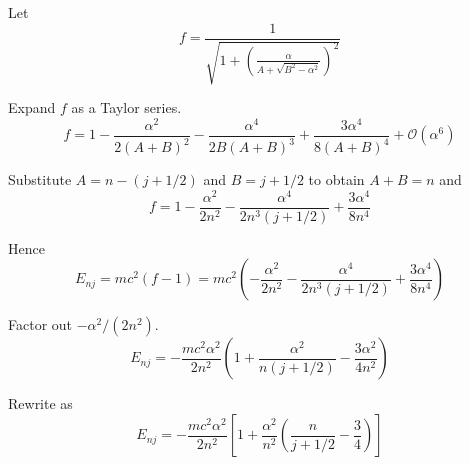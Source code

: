 


Let
\begin{equation*}
f=\frac{1}{\sqrt{\displaystyle1+\left(\frac{\alpha}{A+\sqrt{B^2-\alpha^2}}\right)^2}}
\end{equation*}

Expand $f$ as a Taylor series.
\begin{equation*}
f=1-\frac{\alpha^2}{2(A+B)^2}-\frac{\alpha^4}{2B(A+B)^3}+\frac{3\alpha^4}{8(A+B)^4}+\mathcal O(\alpha^6)
\end{equation*}

Substitute $A=n-(j+1/2)$ and $B=j+1/2$ to obtain $A+B=n$ and
\begin{equation*}
f=1-\frac{\alpha^2}{2n^2}-\frac{\alpha^4}{2n^3(j+1/2)}+\frac{3\alpha^4}{8n^4}
\tag{1}
\end{equation*}

Hence
\begin{equation*}
E_{nj}=mc^2(f-1)=mc^2\left(-\frac{\alpha^2}{2n^2}-\frac{\alpha^4}{2n^3(j+1/2)}+\frac{3\alpha^4}{8n^4}\right)
\end{equation*}

Factor out $-\alpha^2/(2n^2)$.
\begin{equation*}
E_{nj}=-\frac{mc^2\alpha^2}{2n^2}
\left(1+\frac{\alpha^2}{n(j+1/2)}-\frac{3\alpha^2}{4n^2}\right)
\tag{2}
\end{equation*}

Rewrite as
\begin{equation*}
E_{nj}=-\frac{mc^2\alpha^2}{2n^2}
\left[1+\frac{\alpha^2}{n^2}\left(\frac{n}{j+1/2}-\frac{3}{4}\right)\right]
\end{equation*}


